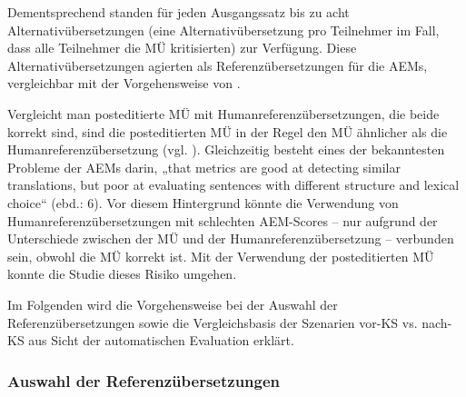 Dementsprechend standen für jeden Ausgangssatz bis zu acht Alternativübersetzungen (eine Alternativübersetzung pro Teilnehmer im Fall, dass alle Teilnehmer die MÜ kritisierten) zur Verfügung. Diese Alternativübersetzungen agierten als Referenzübersetzungen für die AEMs, vergleichbar mit der Vorgehensweise von \citet{SnoverEtAl2006}.

Vergleicht man posteditierte MÜ mit Humanreferenzübersetzungen, die beide korrekt sind, sind die posteditierten MÜ in der Regel den MÜ ähnlicher als die Humanreferenzübersetzung (vgl. \citealt{DenkowskiLavie2012}). Gleichzeitig besteht eines der bekanntesten Probleme der AEMs darin, „that metrics are good at detecting similar translations, but poor at evaluating sentences with different structure and lexical choice“ (ebd.: 6). Vor diesem Hintergrund könnte die Verwendung von Humanreferenzübersetzungen mit schlechten AEM-Scores -- nur aufgrund der Unterschiede zwischen der MÜ und der Humanreferenzübersetzung -- verbunden sein, obwohl die MÜ korrekt ist. Mit der Verwendung der posteditierten MÜ konnte die Studie dieses Risiko umgehen.

Im Folgenden wird die Vorgehensweise bei der Auswahl der Referenzübersetzungen sowie die Vergleichsbasis der Szenarien vor-KS vs. nach-KS aus Sicht der automatischen Evaluation erklärt.


\subsubsection{\label{sec:4.4.6.2}Auswahl der Referenzübersetzungen}

